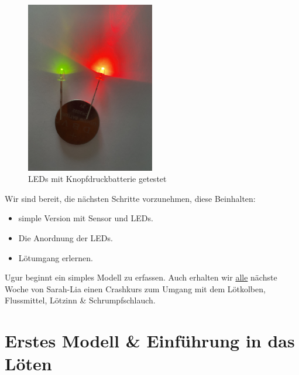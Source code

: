\documentclass[12pt]{article}
\begin{document}
\begin{figure}[H]
\begin{center}
\includegraphics[width=0.5\textwidth]{pics/leds.jpeg}
\caption{LEDs mit Knopfdruckbatterie getestet}
\label{Fig:leds}
\end{center}
\end{figure}\par
Wir sind bereit, die nächsten Schritte vorzunehmen, diese Beinhalten: 
\begin{itemize}
\item simple Version mit Sensor und LEDs.
\item Die Anordnung der LEDs.
\item Lötumgang erlernen.
\end{itemize} Ugur beginnt ein simples Modell zu erfassen. Auch erhalten wir \underline{alle} nächste Woche von Sarah-Lia einen Crashkurs zum Umgang mit dem Lötkolben, Flussmittel, Lötzinn \& Schrumpfschlauch.
\section{Erstes Modell \& Einführung in das Löten}
\end{document}
